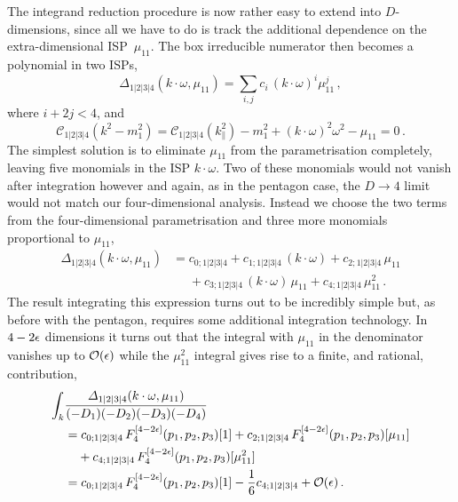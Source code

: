 The integrand reduction procedure is now rather easy to extend into
$D$-dimensions, since all we have to do is track the additional dependence on
the extra-dimensional ISP~$\mu_{11}$. The box irreducible numerator then becomes a polynomial in two ISPs,
\begin{equation}
  \Delta_{1|2|3|4}(k\cdot\omega, \mu_{11}) = \sum_{i,j} c_i \, (k\cdot\omega)^i \mu_{11}^j \,,
\end{equation}
where $i+2j<4$, and
\begin{equation}
  \mathcal{C}_{1|2|3|4} \left( k^2 - m_1^2 \right) = \mathcal{C}_{1|2|3|4} \left( k_{\parallel}^2  \right) - m_1^2 + (k\cdot\omega)^2 \omega^2 - \mu_{11} = 0\,.
  \label{eq:boxksqconditionD}
\end{equation}
The simplest solution is to eliminate $\mu_{11}$ from the parametrisation
completely, leaving five monomials in the ISP $k\cdot\omega$. Two of these
monomials would not vanish after integration however and again, as in the
pentagon case, the $D\to 4$ limit would not match our four-dimensional
analysis. Instead we choose the two terms from the four-dimensional
parametrisation and three more monomials proportional to $\mu_{11}$, 
\begin{align}
  \Delta_{1|2|3|4}(k\cdot\omega, \mu_{11}) & =  c_{0;1|2|3|4}
  + c_{1;1|2|3|4} \, (k\cdot\omega)
  + c_{2;1|2|3|4} \, \mu_{11} \nonumber\\
  & \phantom{= {}} + c_{3;1|2|3|4} \, (k\cdot\omega) \, \mu_{11}
  + c_{4;1|2|3|4} \, \mu_{11}^2 \,.
  \label{eq:boxparamD}
\end{align}
The result integrating this expression turns out to be incredibly simple but,
as before with the pentagon, requires some additional integration technology.
In $4-2\epsilon$ dimensions it turns out that the integral with $\mu_{11}$ in the
denominator vanishes up to $\mathcal{O}(\epsilon)$ while the $\mu_{11}^2$ integral
gives rise to a finite, and rational, contribution,
\begin{align}
  \int_k &\frac{\Delta_{1|2|3|4}(k\cdot\omega, \mu_{11})}{(-D_1) (-D_2) (-D_3) (-D_4)} \nonumber \\
  & = c_{0;1|2|3|4} \, F^{[4-2\eps]}_4(p_1,p_2,p_3)[1]
    + c_{2;1|2|3|4} \, F^{[4-2\eps]}_4(p_1,p_2,p_3)[\mu_{11}] \nonumber\\
  & \phantom{= {}} + c_{4;1|2|3|4} \, F^{[4-2\eps]}_4(p_1,p_2,p_3)[\mu_{11}^2] \nonumber\\&
    = 
    c_{0;1|2|3|4} \, F^{[4-2\eps]}_4(p_1,p_2,p_3)[1] - \frac{1}{6} c_{4;1|2|3|4} + \mathcal{O}(\eps) \,.
\end{align}
